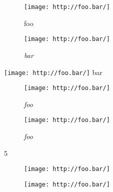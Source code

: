
\def\mytitle{Figure Images}


\begin{figure}[htbp]
\centering
\texttt{[image: http://foo.bar/]}
\caption[foo]{foo}
\label{foo}
\end{figure}

\begin{figure}[htbp]
\centering
\texttt{[image: http://foo.bar/]}
\caption[foo]{\emph{bar}}
\label{foo}
\end{figure}

\texttt{[image: http://foo.bar/]} bar

\begin{figure}[htbp]
\centering
\texttt{[image: http://foo.bar/]}
\caption[foo]{\emph{foo}}
\end{figure}

\begin{figure}[htbp]
\centering
\texttt{[image: http://foo.bar/]}
\caption[foo]{\emph{foo}}
\end{figure}

5

\begin{figure}[htbp]
\centering
\texttt{[image: http://foo.bar/]}
\end{figure}

\begin{figure}[htbp]
\centering
\texttt{[image: http://foo.bar/]}
\caption[empty caption with title]{}
\end{figure}



